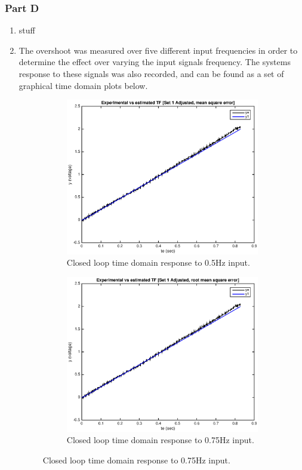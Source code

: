\documentclass[11pt,a4paper]{article}
\begin{document}
\subsubsection{Part D}
\label{sec:d}
\begin{enumerate}
	\item stuff
	
	
	
	
	
	\item The overshoot was measured over five different input frequencies in order to determine the effect over varying the input signals frequency. The systems response to these signals was also recorded, and can be found as a set of graphical time domain plots below.
	\begin{figure}[H]
	  \begin{subfigure}{0.5\textwidth}
	  \includegraphics[width=0.9\linewidth]{Matlab_Figures/y2_dataset1_ms.eps} 
	  \caption{Closed loop time domain response to 0.5Hz input.}
	  \label{fig:subim1}
	  \end{subfigure}
	  \begin{subfigure}{0.5\textwidth}
	  \includegraphics[width=0.9\linewidth]{Matlab_Figures/y2_dataset1_rms.eps}
	  \caption{Closed loop time domain response to 0.75Hz input.}
	  \label{fig:subim2}
	  \end{subfigure}
	  

\end{figure}
\end{enumerate}
\end{document}
